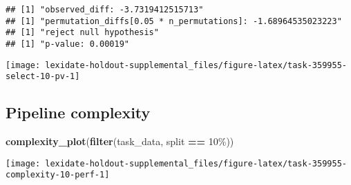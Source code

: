 \documentclass[
]{book}
\newenvironment{Shaded}{\begin{snugshade}}{\end{snugshade}}
\newcommand{\AttributeTok}[1]{\textcolor[rgb]{0.13,0.29,0.53}{#1}}
\newcommand{\DecValTok}[1]{\textcolor[rgb]{0.00,0.00,0.81}{#1}}
\newcommand{\FunctionTok}[1]{\textcolor[rgb]{0.13,0.29,0.53}{\textbf{#1}}}
\newcommand{\NormalTok}[1]{#1}
\newcommand{\OtherTok}[1]{\textcolor[rgb]{0.56,0.35,0.01}{#1}}
\newcommand{\SpecialCharTok}[1]{\textcolor[rgb]{0.81,0.36,0.00}{\textbf{#1}}}
\newcommand{\StringTok}[1]{\textcolor[rgb]{0.31,0.60,0.02}{#1}}
\begin{document}
\begin{Shaded}
\end{Shaded}

\begin{verbatim}
## [1] "observed_diff: -3.7319412515713"
## [1] "permutation_diffs[0.05 * n_permutations]: -1.68964535023223"
## [1] "reject null hypothesis"
## [1] "p-value: 0.00019"
\end{verbatim}

\texttt{[image: lexidate-holdout-supplemental\_files/figure-latex/task-359955-select-10-pv-1]}

\hypertarget{pipeline-complexity-11}{%
\subsection{Pipeline complexity}\label{pipeline-complexity-11}}

\begin{Shaded}
\begin{Highlighting}[]
\FunctionTok{complexity\_plot}\NormalTok{(}\FunctionTok{filter}\NormalTok{(task\_data, split }\SpecialCharTok{==} \StringTok{\textquotesingle{}10\%\textquotesingle{}}\NormalTok{))}
\end{Highlighting}
\end{Shaded}

\texttt{[image: lexidate-holdout-supplemental\_files/figure-latex/task-359955-complexity-10-perf-1]}
\end{document}
